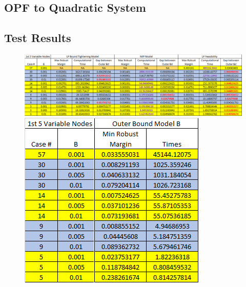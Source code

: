 \subsection*{OPF to Quadratic System}


\subsection*{Test Results}
\begin{figure}[h]
\begin{center}
\includegraphics[scale=0.4]{Figures/InnerBoundTable} \includegraphics[scale=0.4]{Figures/OuterBoundTable} 
\end{center}
\label{tbl:Table1}
\end{figure} 
